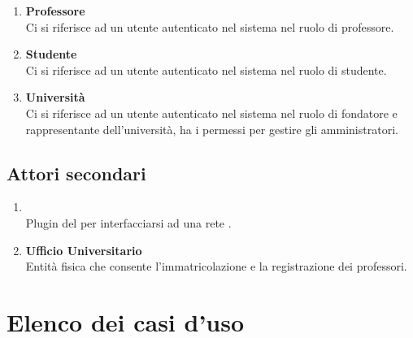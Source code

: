 \documentclass[AnalisiDeiRequisiti.tex]{subfiles}
\begin{document}
\begin{enumerate}
	\item \textbf{Professore}\\
	Ci si riferisce ad un utente autenticato nel sistema nel ruolo di professore.\\
	
	\item \textbf{Studente}\\
	Ci si riferisce ad un utente autenticato nel sistema nel ruolo di studente.\\
		
	\item \textbf{Università}\\
	Ci si riferisce ad un utente autenticato nel sistema nel ruolo di fondatore e rappresentante dell'università, ha i permessi per gestire gli amministratori.\\	
\end{enumerate}

\subsection{Attori secondari}
\begin{enumerate}
	\item \textbf{}\\
	Plugin del   per interfacciarsi ad una rete .\\
	
	\item \textbf{Ufficio Universitario}\\
	Entità fisica che consente l'immatricolazione e la registrazione dei professori.\\
\end{enumerate}

\section{Elenco dei casi d'uso}
\end{document}
